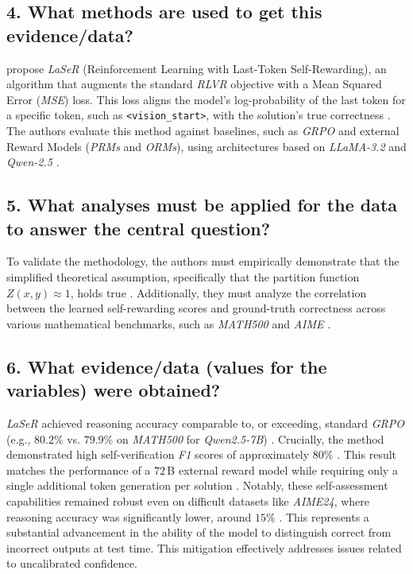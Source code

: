 \documentclass[a4paper,oneside,10pt,ngerman,english]{scrartcl}
\begin{document}
\subsection*{4. What methods are used to get this evidence/data?}
\citet{laser} propose \textit{LaSeR} (Reinforcement Learning with Last-Token Self-Rewarding), an algorithm that augments the standard \textit{RLVR} objective with a Mean Squared Error (\textit{MSE}) loss. This loss aligns the model's log-probability of the last token for a specific token, such as \texttt{<vision\_start>}, with the solution's true correctness \citep{laser}. The authors evaluate this method against baselines, such as \textit{GRPO} and external Reward Models (\textit{PRMs} and \textit{ORMs}), using architectures based on \textit{LLaMA-3.2} and \textit{Qwen-2.5} \citep{laser}.

\subsection*{5. What analyses must be applied for the data to answer the central question?}
To validate the methodology, the authors must empirically demonstrate that the simplified theoretical assumption, specifically that the partition function $Z(x,y) \approx 1$, holds true \citep{laser}. Additionally, they must analyze the correlation between the learned self-rewarding scores and ground-truth correctness across various mathematical benchmarks, such as \textit{MATH500} and \textit{AIME} \citep{laser}.

\subsection*{6. What evidence/data (values for the variables) were obtained?}
\textit{LaSeR} achieved reasoning accuracy comparable to, or exceeding, standard \textit{GRPO} (e.g., $80.2\%$ vs. $79.9\%$ on \textit{MATH500} for \textit{Qwen2.5-7B}) \citep{laser}. Crucially, the method demonstrated high self-verification \textit{F1} scores of approximately $80\%$ \citep{laser}. This result matches the performance of a $72$\,B external reward model while requiring only a single additional token generation per solution \citep{laser}. Notably, these self-assessment capabilities remained robust even on difficult datasets like \textit{AIME24}, where reasoning accuracy was significantly lower, around $15\%$ \citep{laser}. This represents a substantial advancement in the ability of the model to distinguish correct from incorrect outputs at test time. This mitigation effectively addresses issues related to uncalibrated confidence.
\end{document}
